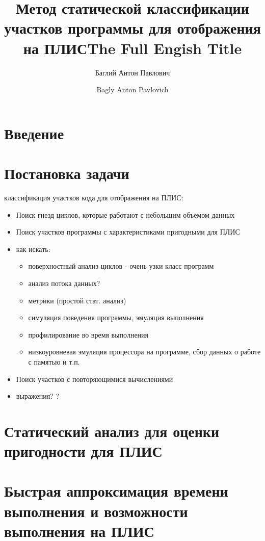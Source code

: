 \documentclass[utf8]{psta}%
\title[кратко]{Метод статической классификации участков программы для отображения на ПЛИС}
\author{Баглий Антон Павлович}
\title[Short title]{The Full Engish Title}
\author{Bagly Anton Pavlovich}
\begin{document}
           
\maketitle   
\section*{Введение}

\section{Постановка задачи} 

классификация участков кода для отображения на ПЛИС:

\begin{itemize}
    \item Поиск гнезд циклов, которые работают с небольшим объемом данных
    \item Поиск участков программы с характеристиками пригодными для ПЛИС
    \item как искать:
    \begin{itemize}
        \item поверхностный анализ циклов - очень узки класс программ
        \item анализ потока данных?
        \item метрики (простой стат. анализ)
        \item симуляция поведения программы, эмуляция выполнения
        \item профилирование во время выполнения
        \item низкоуровневая эмуляция процессора на программе, сбор данных о работе с памятью и т.п.
    \end{itemize}
   \item Поиск участков с повторяющимися вычислениями
   \item выражения?
   ?
\end{itemize}

\section{Статический анализ для оценки пригодности для ПЛИС}

\section{Быстрая аппроксимация времени выполнения и возможности выполнения на ПЛИС} 
\end{document}
